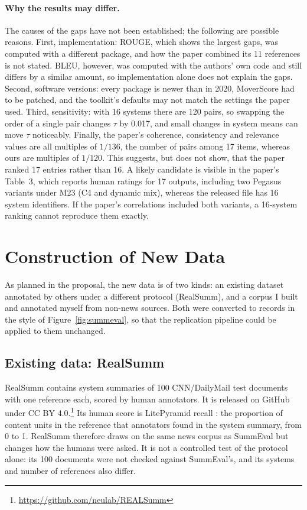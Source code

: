 \documentclass[11pt]{article}
\begin{document}
\paragraph{Why the results may differ.}
The causes of the gaps have not been established; the following are possible reasons. First, implementation: ROUGE, which shows the largest gaps, was computed with a different package, and how the paper combined its 11 references is not stated. BLEU, however, was computed with the authors' own code and still differs by a similar amount, so implementation alone does not explain the gaps. Second, software versions: every package is newer than in 2020, MoverScore had to be patched, and the toolkit's defaults may not match the settings the paper used. Third, sensitivity: with 16 systems there are 120 pairs, so swapping the order of a single pair changes $\tau$ by 0.017, and small changes in system means can move $\tau$ noticeably. Finally, the paper's coherence, consistency and relevance values are all multiples of $1/136$, the number of pairs among 17 items, whereas ours are multiples of $1/120$. This suggests, but does not show, that the paper ranked 17 entries rather than 16. A likely candidate is visible in the paper's Table~3, which reports human ratings for 17 outputs, including two Pegasus variants under M23 (C4 and dynamic mix), whereas the released file has 16 system identifiers. If the paper's correlations included both variants, a 16-system ranking cannot reproduce them exactly.

\section{Construction of New Data}
\label{sec:newdata}

As planned in the proposal, the new data is of two kinds: an existing dataset annotated by others under a different protocol (RealSumm), and a corpus I built and annotated myself from non-news sources. Both were converted to records in the style of Figure~\ref{fig:summeval}, so that the replication pipeline could be applied to them unchanged.

\subsection{Existing data: RealSumm}
\label{sec:realsumm}

RealSumm \citep{bhandari-etal-2020-reevaluating} contains system summaries of 100 CNN/DailyMail test documents with one reference each, scored by human annotators. It is released on GitHub under CC BY 4.0.\footnote{\url{https://github.com/neulab/REALSumm}} Its human score is LitePyramid recall \citep{shapira-etal-2019-crowdsourcing}: the proportion of content units in the reference that annotators found in the system summary, from 0 to 1. RealSumm therefore draws on the same news corpus as SummEval but changes how the humans were asked. It is not a controlled test of the protocol alone: its 100 documents were not checked against SummEval's, and its systems and number of references also differ.
\end{document}
